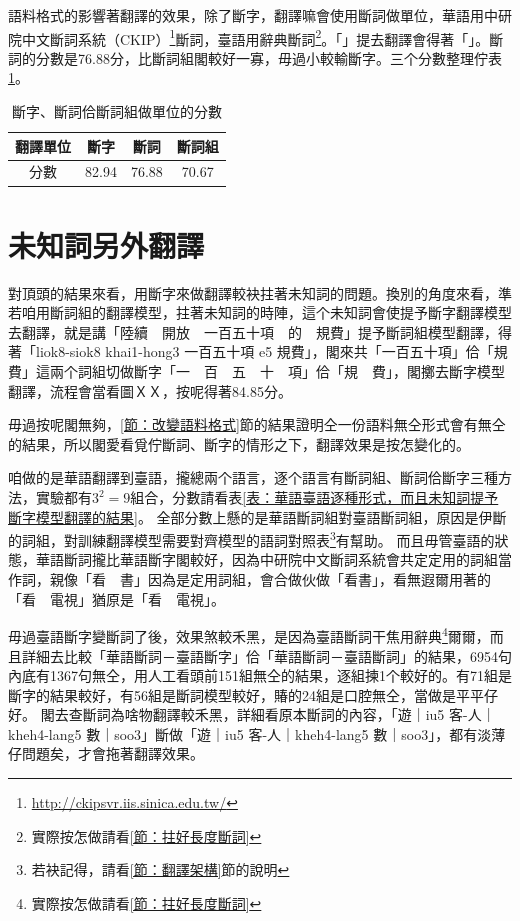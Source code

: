 \documentclass[final,oneside,onecolumn,12pt,a4paper]{book}%
\begin{document}
語料格式的影響著翻譯的效果，除了斷字，翻譯嘛會使用斷詞做單位，華語用中研院中文斷詞系統（CKIP）\footnote{\url{http://ckipsvr.iis.sinica.edu.tw/}}斷詞，臺語用辭典斷詞\footnote{實際按怎做請看\ref{節：拄好長度斷詞}}。「」提去翻譯會得著「」。斷詞的分數是76.88分，比斷詞組閣較好一寡，毋過小較輸斷字。三个分數整理佇表\ref{表：斷詞組、斷詞、斷字做單位的翻譯分數}。

\begin{table}
\caption{斷字、斷詞佮斷詞組做單位的分數}%
\label{表：斷詞組、斷詞、斷字做單位的翻譯分數}
\centering
\begin{tabular}{c|ccc}
翻譯單位 & 斷字 & 斷詞 & 斷詞組\\
\hline
分數　& 82.94 & 76.88 & 70.67\\
\end{tabular}
\end{table}

\section{未知詞另外翻譯}
\label{節：未知詞另外翻譯}

對頂頭的結果來看，用斷字來做翻譯較袂拄著未知詞的問題。換別的角度來看，準若咱用斷詞組的翻譯模型，拄著未知詞的時陣，這个未知詞會使提予斷字翻譯模型去翻譯，就是講「陸續　開放　一百五十項　的　規費」提予斷詞組模型翻譯，得著「liok8-siok8 khai1-hong3 一百五十項 e5 規費」，閣來共「一百五十項」佮「規費」這兩个詞組切做斷字「一　百　五　十　項」佮「規　費」，閣擲去斷字模型翻譯，流程會當看圖ＸＸ，按呢得著84.85分。

毋過按呢閣無夠，\ref{節：改變語料格式}節的結果證明仝一份語料無仝形式會有無仝的結果，所以閣愛看覓佇斷詞、斷字的情形之下，翻譯效果是按怎變化的。

咱做的是華語翻譯到臺語，攏總兩个語言，逐个語言有斷詞組、斷詞佮斷字三種方法，實驗都有$3^{2}=9$組合，分數請看表\ref{表：華語臺語逐種形式，而且未知詞提予斷字模型翻譯的結果}。
全部分數上懸的是華語斷詞組對臺語斷詞組，原因是伊斷的詞組，對訓練翻譯模型需要對齊模型的語詞對照表\footnote{若袂記得，請看\ref{節：翻譯架構}節的說明}有幫助。
而且毋管臺語的狀態，華語斷詞攏比華語斷字閣較好，因為中研院中文斷詞系統會共定定用的詞組當作詞，親像「看　書」因為是定用詞組，會合做伙做「看書」，看無遐爾用著的「看　電視」猶原是「看　電視」。

毋過臺語斷字變斷詞了後，效果煞較禾黑，是因為臺語斷詞干焦用辭典\footnote{實際按怎做請看\ref{節：拄好長度斷詞}}爾爾，而且詳細去比較「華語斷詞－臺語斷字」佮「華語斷詞－臺語斷詞」的結果，6954句內底有1367句無仝，用人工看頭前151組無仝的結果，逐組揀1个較好的。有71組是斷字的結果較好，有56組是斷詞模型較好，賰的24組是口腔無仝，當做是平平仔好。
閣去查斷詞為啥物翻譯較禾黑，詳細看原本斷詞的內容，「遊｜iu5 客-人｜kheh4-lang5 數｜soo3」斷做「遊｜iu5 客-人｜kheh4-lang5 數｜soo3」，都有淡薄仔問題矣，才會拖著翻譯效果。
\end{document}
